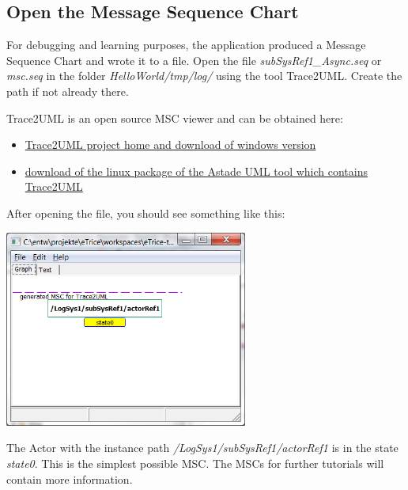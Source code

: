 \subsection{Open the Message Sequence Chart}

For debugging and learning purposes, the application produced a Message Sequence Chart and wrote it to a file. Open the file \emph{subSysRef1\_Async.seq} or \emph{msc.seq} in the folder \emph{HelloWorld/tmp/log/} using the tool Trace2UML. Create the path if not already there.

Trace2UML is an open source MSC viewer and can be obtained here:
\begin{itemize}
\item \href{http://trace2uml.tigris.org/}{Trace2UML project home and download of windows version} 
\item \href{http://apt.astade.de/}{download of the linux package of the Astade UML tool which contains Trace2UML}
\end{itemize}
After opening the file, you should see something like this:

\includegraphics[width=0.6\textwidth]{images/015-HelloWorld09.png}

The Actor with the instance path \emph{/LogSys1/subSysRef1/actorRef1} is in the state \emph{state0}. 
This is the simplest possible MSC. The MSCs for further tutorials will contain more information.
